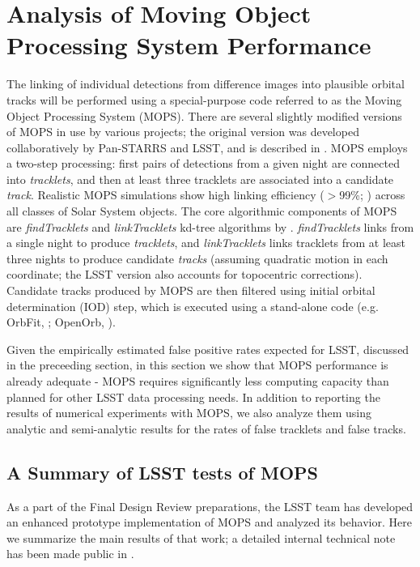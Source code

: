 
\section{Analysis of Moving Object Processing System Performance \label{sec:mops}}


The linking of individual detections from difference images into plausible orbital tracks will be performed using
a special-purpose code referred to as the Moving Object Processing System (MOPS). There are several slightly modified
versions of MOPS in use by various projects; the original version was developed collaboratively by Pan-STARRS
and LSST, and is described in \cite{denneau13}. MOPS employs a two-step processing: first pairs of detections
from a given night are connected into {\it tracklets}, and then at least three tracklets are associated into a
candidate {\it track}. Realistic MOPS simulations show high linking efficiency ($>$99\%; \citealt{denneau13})
across all classes of Solar System objects. The core algorithmic components of MOPS are {\it findTracklets} and
{\it linkTracklets} kd-tree algorithms by \citet{kubica07}. {\it findTracklets} links \DIASources from a single
night to produce {\it tracklets}, and {\it linkTracklets} links tracklets from at least three nights to produce candidate
{\it tracks} (assuming quadratic motion in each coordinate; the LSST version also accounts for topocentric
corrections). Candidate tracks produced by MOPS are then filtered using initial orbital determination (IOD) step,
which is executed using a stand-alone code (e.g. OrbFit, \citealt{milani08}; OpenOrb, \citealt{OpenOrb2009}).

Given the empirically estimated false positive rates expected for LSST, discussed in the preceeding section,
in this section we show that MOPS performance is already adequate - MOPS requires significantly less
computing capacity than planned for other LSST data processing needs. In addition to reporting the results of
numerical experiments with MOPS, we also analyze them using analytic and semi-analytic results for the
rates of false tracklets and false tracks.




\subsection{A Summary of LSST tests of MOPS}

As a part of the Final Design Review preparations, the LSST team has developed an enhanced prototype
implementation of MOPS and analyzed its behavior. Here we summarize the main results of that work;
a detailed internal technical note has been made public in \cite{LDM-156}.

